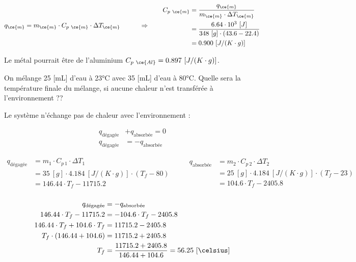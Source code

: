 \documentclass[
  11pt,
  a4paper,
  openany]{book}
\begin{document}
\begin{Answer}
\[
\begin{split}
q_{\ce{m}} &= m_{\ce{m}} \cdot C_{p\ \ce{m}} \cdot \Delta T_{\ce{m}}
\end{split}
\qquad \Rightarrow \qquad
\begin{split}
C_{p\ \ce{m}} &= \frac{q_{\ce{m}}}{m_{\ce{m}} \cdot \Delta T_{\ce{m}}} \\
 &= \frac{6.64 \cdot 10^3\ [J]}{348\ [g] \cdot (43.6 - 22.4)} \\
 &= 0.900\ [J/(K \cdot g)] \\
\end{split}
\]

Le métal pourrait être de l'aluminium \(C_{p\ \ce{Al}} = 0.897\ [J/(K \cdot g)]\).

\end{Answer}

\begin{Exercise}

On mélange 25 {[}mL{]} d'eau à 23°C avec 35 {[}mL{]} d'eau à 80°C. Quelle sera la température finale du mélange, si aucune chaleur n'est transférée à l'environnement ??


\end{Exercise}

\begin{Answer}
Le système n'échange pas de chaleur avec l'environnement :

\[
\begin{split}
q_{\text{dégagée}} &+ q_{\text{absorbée}} = 0 \\
q_{\text{dégagée}} &= - q_{\text{absorbée}}
\end{split}
\]

\[
\begin{split}
q_{\text{dégagée}} &= m_1 \cdot C_{p\ 1} \cdot \Delta T_1 \\
  &= 35\ [g] \cdot 4.184\ [J/(K \cdot g)] \cdot (T_f - 80) \\
  &= 146.44 \cdot T_f - 11715.2 \\
\end{split}
\qquad
\begin{split}
q_{\text{absorbée}} &= m_2 \cdot C_{p\ 2} \cdot \Delta T_2 \\
  &= 25\ [g] \cdot 4.184\ [J/(K \cdot g)] \cdot (T_f - 23) \\
  &= 104.6 \cdot T_f - 2405.8 \\
\end{split}
\]

\[
\begin{split}
q_{\text{dégagée}} &= - q_{\text{absorbée}} \\
146.44 \cdot T_f - 11715.2 &= - 104.6 \cdot T_f - 2405.8 \\
146.44 \cdot T_f + 104.6 \cdot T_f &= 11715.2 - 2405.8 \\
T_f \cdot (146.44 + 104.6) &= 11715.2 + 2405.8 \\
T_f &= \frac{11715.2 + 2405.8}{146.44+104.6} = 56.25\ [\celsius]
\end{split}
\]

\end{Answer}
\end{document}
